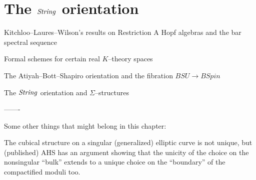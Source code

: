 \section{The $\mathit{String}$ orientation}

Kitchloo--Laures--Wilson's results on Restriction A Hopf algebras and the bar spectral sequence

Formal schemes for certain real $K$--theory spaces

The Atiyah--Bott--Shapiro orientation and the fibration $BSU \to BSpin$ 

The $\mathit{String}$ orientation and $\Sigma$--structures




-------

Some other things that might belong in this chapter:

The cubical structure on a singular (generalized) elliptic curve is not unique, but (published) AHS has an argument showing that the unicity of the choice on the nonsingular ``bulk'' extends to a unique choice on the ``boundary'' of the compactified moduli too.












